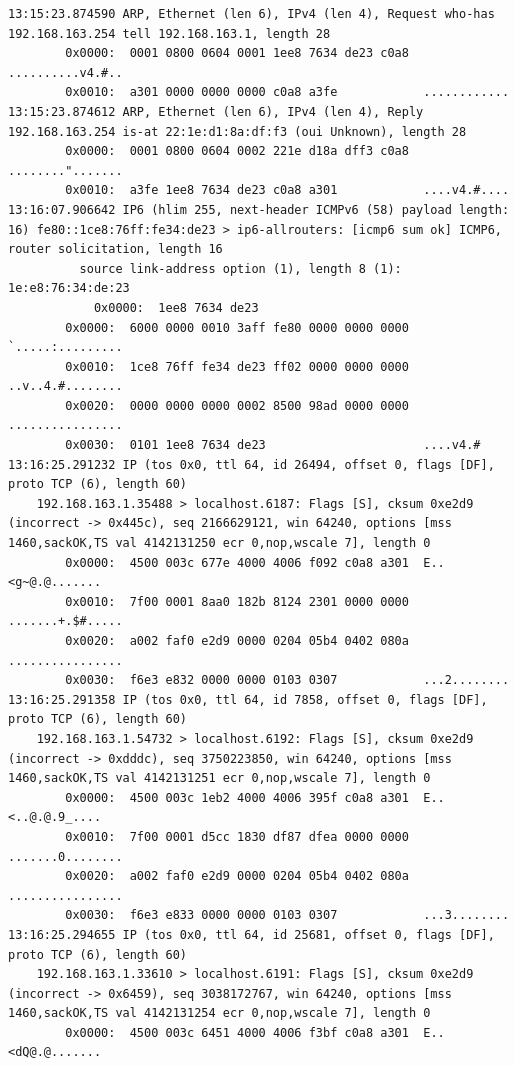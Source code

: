 \documentclass[11pt, a4paper]{article}
\begin{document}
\begin{Verbatim}[fontsize=\footnotesize,breaklines=true]
13:15:23.874590 ARP, Ethernet (len 6), IPv4 (len 4), Request who-has 192.168.163.254 tell 192.168.163.1, length 28
        0x0000:  0001 0800 0604 0001 1ee8 7634 de23 c0a8  ..........v4.#..
        0x0010:  a301 0000 0000 0000 c0a8 a3fe            ............
13:15:23.874612 ARP, Ethernet (len 6), IPv4 (len 4), Reply 192.168.163.254 is-at 22:1e:d1:8a:df:f3 (oui Unknown), length 28
        0x0000:  0001 0800 0604 0002 221e d18a dff3 c0a8  ........".......
        0x0010:  a3fe 1ee8 7634 de23 c0a8 a301            ....v4.#....
13:16:07.906642 IP6 (hlim 255, next-header ICMPv6 (58) payload length: 16) fe80::1ce8:76ff:fe34:de23 > ip6-allrouters: [icmp6 sum ok] ICMP6, router solicitation, length 16
          source link-address option (1), length 8 (1): 1e:e8:76:34:de:23
            0x0000:  1ee8 7634 de23
        0x0000:  6000 0000 0010 3aff fe80 0000 0000 0000  `.....:.........
        0x0010:  1ce8 76ff fe34 de23 ff02 0000 0000 0000  ..v..4.#........
        0x0020:  0000 0000 0000 0002 8500 98ad 0000 0000  ................
        0x0030:  0101 1ee8 7634 de23                      ....v4.#
13:16:25.291232 IP (tos 0x0, ttl 64, id 26494, offset 0, flags [DF], proto TCP (6), length 60)
    192.168.163.1.35488 > localhost.6187: Flags [S], cksum 0xe2d9 (incorrect -> 0x445c), seq 2166629121, win 64240, options [mss 1460,sackOK,TS val 4142131250 ecr 0,nop,wscale 7], length 0
        0x0000:  4500 003c 677e 4000 4006 f092 c0a8 a301  E..<g~@.@.......
        0x0010:  7f00 0001 8aa0 182b 8124 2301 0000 0000  .......+.$#.....
        0x0020:  a002 faf0 e2d9 0000 0204 05b4 0402 080a  ................
        0x0030:  f6e3 e832 0000 0000 0103 0307            ...2........
13:16:25.291358 IP (tos 0x0, ttl 64, id 7858, offset 0, flags [DF], proto TCP (6), length 60)
    192.168.163.1.54732 > localhost.6192: Flags [S], cksum 0xe2d9 (incorrect -> 0xdddc), seq 3750223850, win 64240, options [mss 1460,sackOK,TS val 4142131251 ecr 0,nop,wscale 7], length 0
        0x0000:  4500 003c 1eb2 4000 4006 395f c0a8 a301  E..<..@.@.9_....
        0x0010:  7f00 0001 d5cc 1830 df87 dfea 0000 0000  .......0........
        0x0020:  a002 faf0 e2d9 0000 0204 05b4 0402 080a  ................
        0x0030:  f6e3 e833 0000 0000 0103 0307            ...3........
13:16:25.294655 IP (tos 0x0, ttl 64, id 25681, offset 0, flags [DF], proto TCP (6), length 60)
    192.168.163.1.33610 > localhost.6191: Flags [S], cksum 0xe2d9 (incorrect -> 0x6459), seq 3038172767, win 64240, options [mss 1460,sackOK,TS val 4142131254 ecr 0,nop,wscale 7], length 0
        0x0000:  4500 003c 6451 4000 4006 f3bf c0a8 a301  E..<dQ@.@.......

\end{Verbatim}
\end{document}
